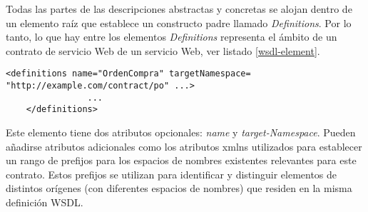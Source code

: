  Todas las partes de las descripciones abstractas y concretas se alojan dentro de un elemento raíz  que establece un constructo padre llamado \textit{Definitions}. Por lo tanto, lo que hay entre los elementos \textit{Definitions} representa el ámbito de un contrato de servicio Web  de un servicio Web, ver listado \ref{wsdl-element}.
 
 \begin{lstlisting}[label=wsdl-element, caption=Elemento \textit{Definitions}. Tomado de \WC]
 	<definitions name="OrdenCompra" targetNamespace= 		"http://example.com/contract/po" ...>
 				...
 	</definitions>
 \end{lstlisting}
 
 Este elemento tiene dos atributos opcionales: \textit{name} y \textit{target-Namespace}. Pueden añadirse  atributos adicionales como los atributos xmlns utilizados para establecer un rango de prefijos para los espacios de nombres existentes relevantes para este contrato. Estos prefijos se utilizan para identificar y distinguir elementos de distintos orígenes (con diferentes espacios de nombres) que residen en la misma definición WSDL.
 
